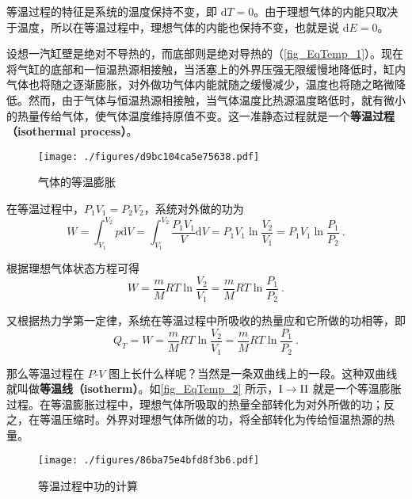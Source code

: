 

等温过程的特征是系统的温度保持不变，即 $\mathrm dT=0$。由于理想气体的内能只取决于温度，所以在等温过程中，理想气体的内能也保持不变，也就是说 $\mathrm dE=0$。

设想一汽缸壁是绝对不导热的，而底部则是绝对导热的（\autoref{fig_EqTemp_1}）。现在将气缸的底部和一恒温热源相接触，当活塞上的外界压强无限缓慢地降低时，缸内气体也将随之逐渐膨胀，对外做功气体内能就随之缓慢减少，温度也将随之略微降低。然而，由于气体与恒温热源相接触，当气体温度比热源温度略低时，就有微小的热量传给气体，使气体温度维持原值不变。这一准静态过程就是一个\textbf{等温过程（isothermal process）}。
\begin{figure}[ht]
\centering
\texttt{[image: ./figures/d9bc104ca5e75638.pdf]}
\caption{气体的等温膨胀} \label{fig_EqTemp_1}
\end{figure}

在等温过程中，$P_1V_1=P_2V_2$，系统对外做的功为
\begin{equation}
W= \int_{V_{1}}^{V_{2}} p \mathrm{d} V=\int_{V_{1}}^{V_{2}} \frac{P_{1} V_{1}}{V} \mathrm{d} V=P_{1} V_{1} \ln \frac{V_{2}}{V_{1}}=P_{1} V_{1} \ln \frac{P_{1}}{P_{2}}~.
\end{equation}

根据理想气体状态方程可得
\begin{equation}
W=\frac{m}{M} R T \ln \frac{V_{2}}{V_{1}}=\frac{m}{M} R T \ln \frac{P_{1}}{P_{2}}~.
\end{equation}

又根据热力学第一定律，系统在等温过程中所吸收的热量应和它所做的功相等，即
\begin{equation}\label{eq_EqTemp_1}
Q_{T}=W=\frac{m}{M} R T \ln \frac{V_{2}}{V_{1}}=\frac{m}{M} R T \ln \frac{P_{1}}{P_{2}}~.
\end{equation}

那么等温过程在 $P$-$V$ 图上长什么样呢？当然是一条双曲线上的一段。这种双曲线就叫做\textbf{等温线（isotherm）}。如\autoref{fig_EqTemp_2} 所示，$\rm I\to II$ 就是一个等温膨胀过程。在等温膨胀过程中，理想气体所吸取的热量全部转化为对外所做的功；反之，在等温压缩时。外界对理想气体所做的功，将全部转化为传给恒温热源的热量。

\begin{figure}[ht]
\centering
\texttt{[image: ./figures/86ba75e4bfd8f3b6.pdf]}
\caption{等温过程中功的计算} \label{fig_EqTemp_2}
\end{figure}
